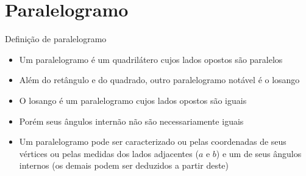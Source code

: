 \section{Paralelogramo}

\begin{frame}[fragile]{Definição de paralelogramo}

    \begin{itemize}
        \item Um paralelogramo é um quadrilátero cujos lados opostos são paralelos

        \item Além do retângulo e do quadrado, outro paralelogramo notável é o losango

        \item O losango é um paralelogramo cujos lados opostos são iguais

        \item Porém seus ângulos internão não são necessariamente iguais

        \item Um paralelogramo pode ser caracterizado ou pelas coordenadas de seus
            vértices ou pelas medidas dos lados adjacentes ($a$ e $b$) e um de
            seus ângulos internos (os demais podem ser deduzidos a partir deste)
    \end{itemize}

    \begin{figure}
        \centering

    \end{figure}

\end{frame}

